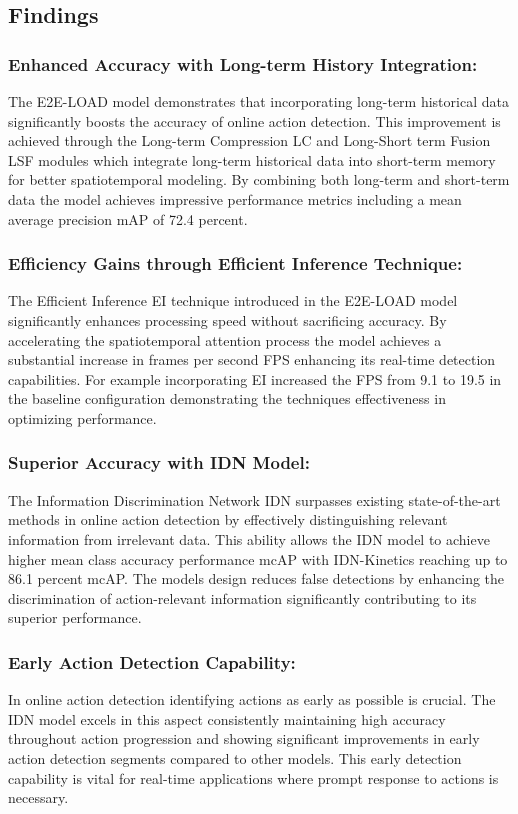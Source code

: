 \subsection{Findings}{




\subsubsection{Enhanced Accuracy with Long-term History Integration:
}
   The E2E-LOAD model demonstrates that incorporating long-term historical data significantly boosts the accuracy of online action detection. This improvement is achieved through the Long-term Compression LC and Long-Short term Fusion LSF modules which integrate long-term historical data into short-term memory for better spatiotemporal modeling. By combining both long-term and short-term data the model achieves impressive performance metrics including a mean average precision mAP of 72.4 percent.

\subsubsection{ Efficiency Gains through Efficient Inference Technique:
}
   The Efficient Inference EI technique introduced in the E2E-LOAD model significantly enhances processing speed without sacrificing accuracy. By accelerating the spatiotemporal attention process the model achieves a substantial increase in frames per second FPS enhancing its real-time detection capabilities. For example incorporating EI increased the FPS from 9.1 to 19.5 in the baseline configuration demonstrating the techniques effectiveness in optimizing performance.

\subsubsection{Superior Accuracy with IDN Model:
}
   The Information Discrimination Network IDN surpasses existing state-of-the-art methods in online action detection by effectively distinguishing relevant information from irrelevant data. This ability allows the IDN model to achieve higher mean class accuracy performance mcAP with IDN-Kinetics reaching up to 86.1 percent mcAP. The models design reduces false detections by enhancing the discrimination of action-relevant information significantly contributing to its superior performance.

\subsubsection{Early Action Detection Capability:
}
   In online action detection identifying actions as early as possible is crucial. The IDN model excels in this aspect consistently maintaining high accuracy throughout action progression and showing significant improvements in early action detection segments compared to other models. This early detection capability is vital for real-time applications where prompt response to actions is necessary.

}
